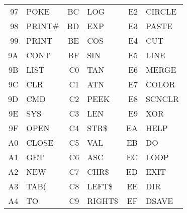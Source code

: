 {\begin{center}
\begin{tabular}{|rp{2.2cm}|rp{2.2cm}|rp{2.2cm}|}
  97 & POKE       &  BC & LOG        &  E2 & CIRCLE     \\
  98 & PRINT\#    &  BD & EXP        &  E3 & PASTE      \\
  99 & PRINT      &  BE & COS        &  E4 & CUT        \\
  9A & CONT       &  BF & SIN        &  E5 & LINE       \\
  9B & LIST       &  C0 & TAN        &  E6 & MERGE      \\
  9C & CLR        &  C1 & ATN        &  E7 & COLOR      \\
  9D & CMD        &  C2 & PEEK       &  E8 & SCNCLR     \\
  9E & SYS        &  C3 & LEN        &  E9 & XOR        \\
  9F & OPEN       &  C4 & STR\$      &  EA & HELP       \\
  A0 & CLOSE      &  C5 & VAL        &  EB & DO         \\
  A1 & GET        &  C6 & ASC        &  EC & LOOP       \\
  A2 & NEW        &  C7 & CHR\$      &  ED & EXIT       \\
  A3 & TAB(       &  C8 & LEFT\$     &  EE & DIR        \\
  A4 & TO         &  C9 & RIGHT\$    &  EF & DSAVE      \\
\hline
\end{tabular}
\end{center}
}
\newpage
